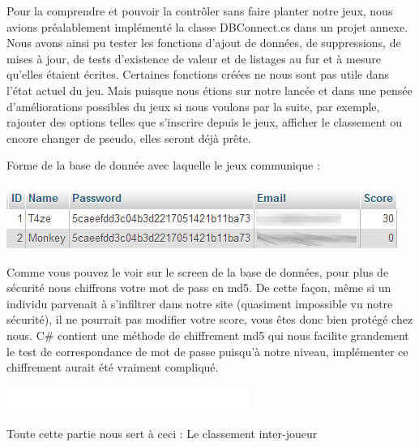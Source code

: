\documentclass [11pt]{report}
\begin{document}
	Pour la comprendre et pouvoir la contrôler sans faire planter notre jeux, nous avions préalablement implémenté la classe DBConnect.cs dans un projet annexe. Nous avons ainsi pu tester les fonctions d'ajout de données, de suppressions, de mises à jour, de tests d'existence de valeur et de listages au fur et à mesure qu'elles étaient écrites. Certaines fonctions créées ne nous sont pas utile dans l'état actuel du jeu. Mais puisque nous étions sur notre lancée et dans une pensée d'améliorations possibles du jeux si nous voulons par la suite, par exemple, rajouter des options telles que s'inscrire depuis le jeux, afficher le classement ou encore changer de pseudo, elles seront déjà prête.\\
	
	\vspace{4mm}
	
	\noindent Forme de la base de donnée avec laquelle le jeux communique :
	\begin{center}
		\includegraphics[scale = 0.8]{images/Bdd.png}
	\end{center}
		
		
	\vspace{10mm}
	
	Comme vous pouvez le voir sur le screen de la base de données, pour plus de sécurité nous chiffrons votre mot de pass en md5. De cette façon, même si un individu parvenait à s'infiltrer dans notre site (quasiment impossible vu notre sécurité), il ne pourrait pas modifier votre score, vous êtes donc bien protégé chez nous. C\# contient une méthode de chiffrement md5 qui nous facilite grandement le test de correspondance de mot de passe puisqu'à notre niveau, implémenter ce chiffrement aurait été vraiment compliqué.
	
		
	\newpage
	
	\begin{center}
			\includegraphics[scale = 0.3]{images/blanc.png}
		\end{center}
	
	\noindent Toute cette partie nous sert à ceci : Le classement inter-joueur
	
\end{document}
